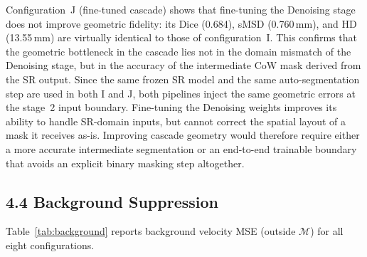 \documentclass[11pt]{article}
\begin{document}
Configuration~J (fine-tuned cascade) shows that fine-tuning the Denoising stage does not
improve geometric fidelity: its Dice (0.684), sMSD (0.760\,mm), and HD (13.55\,mm) are
virtually identical to those of configuration~I.  This confirms that the geometric bottleneck
in the cascade lies not in the domain mismatch of the Denoising stage, but in the accuracy of
the intermediate CoW mask derived from the SR output.  Since the same frozen SR model and the
same auto-segmentation step are used in both I and J, both pipelines inject the same geometric
errors at the stage~2 input boundary.  Fine-tuning the Denoising weights improves its ability
to handle SR-domain inputs, but cannot correct the spatial layout of a mask it receives
as-is.  Improving cascade geometry would therefore require either a more accurate intermediate
segmentation or an end-to-end trainable boundary that avoids an explicit binary masking step
altogether.

\subsection*{4.4 Background Suppression}

Table~\ref{tab:background} reports background velocity MSE (outside $\mathcal{M}$) for all eight
configurations.
\end{document}
